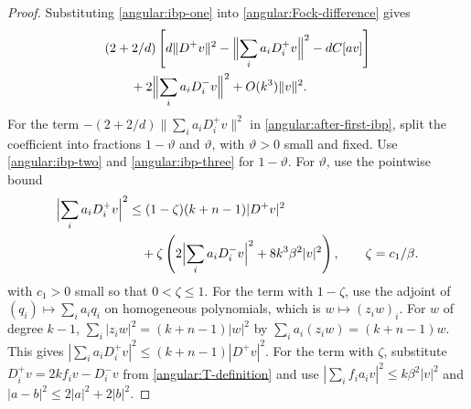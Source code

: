 \documentclass[11pt,a4paper]{article}
\theoremstyle{definition}
\theoremstyle{remark}
\numberwithin{equation}{section}
\begin{document}
\begin{proof}
Substituting \eqref{angular:ibp-one} into
\eqref{angular:Fock-difference} gives
\begin{equation}\label{angular:after-first-ibp}
 \begin{split}
 &(2+2/d)\left[d\|D^+v\|^2
       -\Bigl\|\sum_i a_iD_i^+v\Bigr\|^2-dC[av]\right]\\
 &\qquad+2\Bigl\|\sum_i a_iD_i^-v\Bigr\|^2
                      +O(k^3)\|v\|^2.
 \end{split}
\end{equation}
For the term $-(2+2/d)\|\sum_i a_iD_i^+v\|^2$ in
\eqref{angular:after-first-ibp}, split the coefficient into fractions
$1-\vartheta$ and $\vartheta$, with $\vartheta>0$ small and fixed.
Use \eqref{angular:ibp-two} and \eqref{angular:ibp-three} for
$1-\vartheta$. For $\vartheta$, use the pointwise bound
\begin{equation}\label{angular:convex-bound}
 \begin{split}
 \Bigl|\sum_i a_iD_i^+v\Bigr|^2
 &\le(1-\zeta)(k+n-1)|D^+v|^2\\
 &\quad+\zeta\left(2\Bigl|\sum_i a_iD_i^-v\Bigr|^2
                         +8k^3\beta^2|v|^2\right),
 \qquad \zeta=c_1/\beta.
 \end{split}
\end{equation}
with $c_1>0$ small so that $0<\zeta\le1$. For the term with
$1-\zeta$, use the adjoint of $(q_i)\mapsto\sum_i a_iq_i$ on
homogeneous polynomials, which is $w\mapsto(z_iw)_i$. For $w$ of degree $k-1$,
$\sum_i|z_iw|^2=(k+n-1)|w|^2$ by $\sum_i a_i(z_iw)=(k+n-1)w$.
This gives $|\sum_i a_iD_i^+v|^2\le(k+n-1)|D^+v|^2$.
For the term with $\zeta$, substitute
$D_i^+v=2kf_i v-D_i^-v$ from \eqref{angular:T-definition} and use
$|\sum_i f_i a_i v|^2\le k\beta^2|v|^2$ and $|a-b|^2\le2|a|^2+2|b|^2$.


\end{proof}
\end{document}
